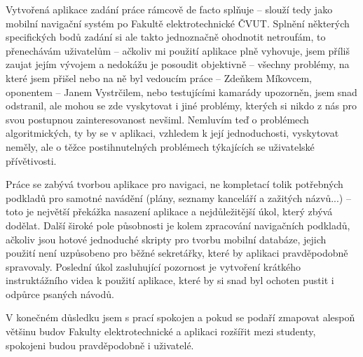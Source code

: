 
Vytvořená aplikace zadání práce rámcově de facto splňuje -- slouží tedy jako mobilní navigační systém po Fakultě elektrotechnické ČVUT. Splnění některých specifických bodů zadání si ale takto jednoznačně ohodnotit netroufám, to přenechávám uživatelům -- ačkoliv mi použití aplikace plně vyhovuje, jsem příliš zaujat jejím vývojem a nedokážu je posoudit objektivně -- všechny problémy, na které jsem přišel nebo na ně byl vedoucím práce -- Zdeňkem Míkovcem, oponentem -- Janem Vystrčilem, nebo testujícími kamarády upozorněn, jsem snad odstranil, ale mohou se zde vyskytovat i jiné problémy, kterých si nikdo z nás pro svou postupnou zainteresovanost nevšiml. Nemluvím teď o problémech algoritmických, ty by se v aplikaci, vzhledem k její jednoduchosti, vyskytovat neměly, ale o těžce postihnutelných problémech týkajících se uživatelské přívětivosti.

Práce se zabývá tvorbou aplikace pro navigaci, ne kompletací tolik potřebných podkladů pro samotné navádění (plány, seznamy kanceláří a zažitých názvů...) -- toto je největší překážka nasazení aplikace a nejdůležitější úkol, který zbývá dodělat. Další široké pole působnosti je kolem zpracování navigačních podkladů, ačkoliv jsou hotové jednoduché skripty pro tvorbu mobilní databáze, jejich použití není uzpůsobeno pro běžné sekretářky, které by aplikaci pravděpodobně spravovaly. Poslední úkol zasluhující pozornost je vytvoření krátkého instruktážního videa k použití aplikace, které by si snad byl ochoten pustit i odpůrce psaných návodů.

V konečném důsledku jsem s prací spokojen a pokud se podaří zmapovat alespoň většinu budov Fakulty elektrotechnické a aplikaci rozšířit mezi studenty, spokojeni budou pravděpodobně i uživatelé.

